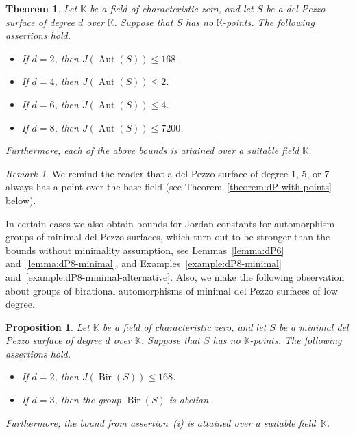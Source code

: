 \documentclass[12pt]{amsart}
\newcounter{cequation}[section]
\newtheorem{theorem}[cequation]{Theorem}
\newtheorem{proposition}[cequation]{Proposition}
\theoremstyle{definition}
\theoremstyle{remark}
\newtheorem{remark}[cequation]{Remark}
\newcommand{\KK}{\mathbb{K}}
\newcommand{\Aut}{\operatorname{Aut}}
\newcommand{\Bir}{\operatorname{Bir}}
\def \le {\leqslant}
\begin{document}
\begin{theorem}\label{theorem:main}
Let $\KK$ be a field of characteristic zero, and let $S$ be a del Pezzo
surface of degree $d$ over $\KK$. Suppose that $S$ has no $\KK$-points.
The following assertions hold.
\begin{itemize}
\item[(i)] If $d=2$, then $J(\Aut(S))\le 168$.

\item[(ii)] If $d=4$, then $J(\Aut(S))\le 2$.

\item[(iii)] If $d=6$, then $J(\Aut(S))\le 4$.

\item[(iv)] If $d=8$, then $J(\Aut(S))\le 7200$.
\end{itemize}
Furthermore, each of the above bounds is attained
over a suitable field $\KK$.
\end{theorem}





\begin{remark}
We remind the reader that a del Pezzo surface of degree $1$, $5$, or $7$
always has a point over the base field
(see Theorem~\ref{theorem:dP-with-points} below).
\end{remark}


In certain cases we also obtain bounds for Jordan constants for automorphism groups of minimal
del Pezzo surfaces, which turn out to be stronger than the bounds without minimality assumption,
see Lemmas~\ref{lemma:dP6} and~\ref{lemma:dP8-minimal},
and Examples~\ref{example:dP8-minimal}
and~\ref{example:dP8-minimal-alternative}.
Also, we make the following observation about groups of birational
automorphisms of
minimal del Pezzo surfaces of low degree.

\begin{proposition}\label{proposition:main}
Let $\KK$ be a field of characteristic zero, and let $S$ be a minimal del Pezzo
surface of degree $d$ over $\KK$. Suppose that
$S$ has no $\KK$-points.
The following assertions hold.
\begin{itemize}
\item[(i)] If $d=2$, then $J(\Bir(S))\le 168$.

\item[(ii)] If $d=3$, then the group $\Bir(S)$ is abelian.
\end{itemize}
Furthermore, the bound from assertion~(i)
is attained over a suitable field~$\KK$.
\end{proposition}
\end{document}
